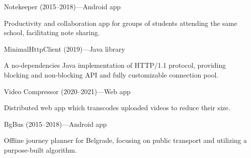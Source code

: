 %
\begin{minipage}[t]{\linewidth}\vspace{\subsectionSpace}
{\rSubtitleFont\bold Notekeeper \medium(2015--2018)---Android app \href{https://github.com/luka-j/StudyGroup}{\faGithub} \href{https://github.com/luka-j/notekeeper-server}{\faGithub}}\newline
\vspace{\ribbonTopMargin}
\ribbonJava \ribbonAndroid \ribbonPlay \ribbonPostgres \newline

{\contentFont Productivity and collaboration app for groups of students attending the same school, facilitating note sharing.}
\end{minipage}\newline%
%
\begin{minipage}[t]{\linewidth}\vspace{\subsectionSpace}
{\rSubtitleFont\bold MinimalHttpClient \medium(2019)---Java library \href{https://github.com/luka-j/MinimalHttpClient}{\faGithub}}\newline
\vspace{\ribbonTopMargin}
\ribbonJava \newline

{\contentFont A no-dependencies Java implementation of HTTP/1.1 protocol, providing blocking and non-blocking API and fully customizable connection pool.}
\end{minipage}\newline%
%
\begin{minipage}[t]{\linewidth}\vspace{\subsectionSpace}
{\rSubtitleFont\bold Video Compressor \medium(2020--2021)---Web app \href{https://github.com/luka-j/MediaCompressor}{\faGithub}}\newline
\vspace{\ribbonTopMargin}
\ribbonKotlin \ribbonSpringBoot \ribbonPostgres \ribbonFfmpeg\newline

{\contentFont Distributed web app which transcodes uploaded videos to reduce their size.}
\end{minipage}\newline%
%
\begin{minipage}[t]{\linewidth}\vspace{\subsectionSpace}
{\rSubtitleFont\bold BgBus \medium(2015--2018)---Android app \href{https://github.com/luka-j/BgBus}{\faGithub}}\newline
\vspace{\ribbonTopMargin}
\ribbonJava \ribbonAndroid \newline

{\contentFont Offline journey planner for Belgrade, focusing on public transport and utilizing a purpose-built algorithm.}
\end{minipage}\newline%
